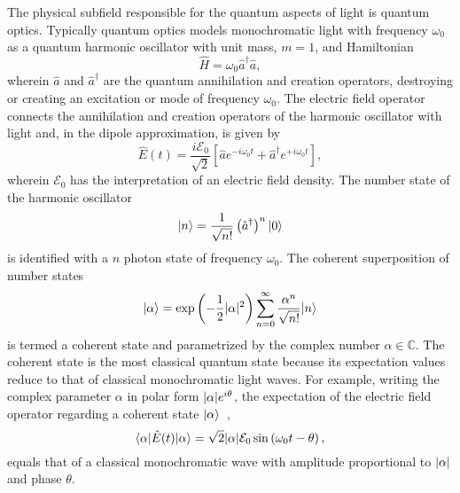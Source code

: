 The physical subfield responsible for the quantum aspects of light is quantum optics.
Typically quantum optics models monochromatic light with frequency $\omega_0$ as a quantum harmonic oscillator with unit mass, $m=1$, and Hamiltonian~\cite{Gerry2005,Fox2006}
\begin{equation*}
	\hat{H}
	=
	\omega_0
	\hat{a}^\dagger
	\hat{a}
	,
\end{equation*}
wherein $\hat{a}$ and $\hat{a}^\dagger$ are the quantum annihilation and creation operators, destroying or creating an excitation or mode of frequency $\omega_0$.
The electric field operator connects the annihilation and creation operators of the harmonic oscillator with light and, in the dipole approximation, is given by~\cite[p.~44]{Gerry2005}
\begin{equation*}
	\hat{E}(t)
	=
	\frac{i\mathcal{E}_0}{\sqrt{2}}
	\left[
		\hat{a}
		e^{-i\omega_0t}
		+
		\hat{a}^\dagger
		e^{+i\omega_0t}
	\right]
	,
\end{equation*}
wherein $\mathcal{E}_0$ has the interpretation of an electric field density.
The number state of the harmonic oscillator
\begin{equation*}
	\lvert n\rangle
	=
	\frac{1}{\sqrt{n!}}
	\left(\hat{a}^\dagger\right)^n
	\lvert0\rangle
\end{equation*}
is identified with a $n$ photon state of frequency $\omega_0$.
The coherent superposition of number states~\cite[p.~44]{Gerry2005}
\begin{equation*}
	\lvert\alpha\rangle
	=
	\exp\left(-\frac{1}{2}\lvert\alpha\rvert^2\right)
	\sum_{n=0}^\infty
	\frac{\alpha^n}{\sqrt{n!}}
	\lvert n\rangle
\end{equation*}
is termed a coherent state and parametrized by the complex number $\alpha\in\mathbb{C}$.
The coherent state is the most classical quantum state because its expectation values reduce to that of classical monochromatic light waves.
For example, writing the complex parameter $\alpha$ in polar form $\lvert\alpha\rvert e^{i\theta}$, the expectation of the electric field operator regarding a coherent state $\lvert\alpha\rangle$~\cite[p.~45]{Gerry2005},
\begin{equation*}
	\langle\alpha\rvert
	\hat{E}(t)
	\lvert\alpha\rangle
	=
	\sqrt{2}
	\lvert\alpha\rvert
	\mathcal{E}_0
	\sin\left(\omega_0t-\theta\right)
	,
\end{equation*}
equals that of a classical monochromatic wave with amplitude proportional to $\lvert\alpha\rvert$ and phase $\theta$.

